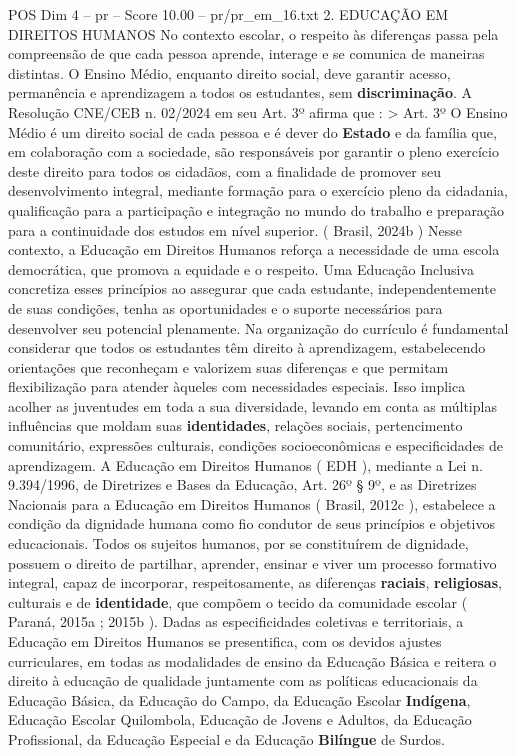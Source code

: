 \begin{textsample}{POS Dim 4 – pr – Score 10.00 – pr/pr\_em\_16.txt}  \label{ex:f4_pos_188}
2.
EDUCAÇÃO EM DIREITOS HUMANOS No contexto escolar, o respeito às diferenças passa pela compreensão de que cada pessoa aprende, interage e se comunica de maneiras distintas.
O Ensino Médio, enquanto direito social, deve garantir acesso, permanência e aprendizagem a todos os estudantes, sem \textbf{discriminação}.
A Resolução CNE/CEB n. 02/2024 em seu Art. 3º afirma que : > Art. 3º O Ensino Médio é um direito social de cada pessoa e é dever do \textbf{Estado} e da família que, em colaboração com a sociedade, são responsáveis por garantir o pleno exercício deste direito para todos os cidadãos, com a finalidade de promover seu desenvolvimento integral, mediante formação para o exercício pleno da cidadania, qualificação para a participação e integração no mundo do trabalho e preparação para a continuidade dos estudos em nível superior. ( Brasil, 2024b ) Nesse contexto, a Educação em Direitos Humanos reforça a necessidade de uma escola democrática, que promova a equidade e o respeito.
Uma Educação Inclusiva concretiza esses princípios ao assegurar que cada estudante, independentemente de suas condições, tenha as oportunidades e o suporte necessários para desenvolver seu potencial plenamente.
Na organização do currículo é fundamental considerar que todos os estudantes têm direito à aprendizagem, estabelecendo orientações que reconheçam e valorizem suas diferenças e que permitam flexibilização para atender àqueles com necessidades especiais.
Isso implica acolher as juventudes em toda a sua diversidade, levando em conta as múltiplas influências que moldam suas \textbf{identidades}, relações sociais, pertencimento comunitário, expressões culturais, condições socioeconômicas e especificidades de aprendizagem.
A Educação em Direitos Humanos ( EDH ), mediante a Lei n. 9.394/1996, de Diretrizes e Bases da Educação, Art. 26º § 9º, e as Diretrizes Nacionais para a Educação em Direitos Humanos ( Brasil, 2012c ), estabelece a condição da dignidade humana como fio condutor de seus princípios e objetivos educacionais.
Todos os sujeitos humanos, por se constituírem de dignidade, possuem o direito de partilhar, aprender, ensinar e viver um processo formativo integral, capaz de incorporar, respeitosamente, as diferenças \textbf{raciais}, \textbf{religiosas}, culturais e de \textbf{identidade}, que compõem o tecido da comunidade escolar ( Paraná, 2015a ; 2015b ).
Dadas as especificidades coletivas e territoriais, a Educação em Direitos Humanos se presentifica, com os devidos ajustes curriculares, em todas as modalidades de ensino da Educação Básica e reitera o direito à educação de qualidade juntamente com as políticas educacionais da Educação Básica, da Educação do Campo, da Educação Escolar \textbf{Indígena}, Educação Escolar Quilombola, Educação de Jovens e Adultos, da Educação Profissional, da Educação Especial e da Educação \textbf{Bilíngue} de Surdos.

\end{textsample}
